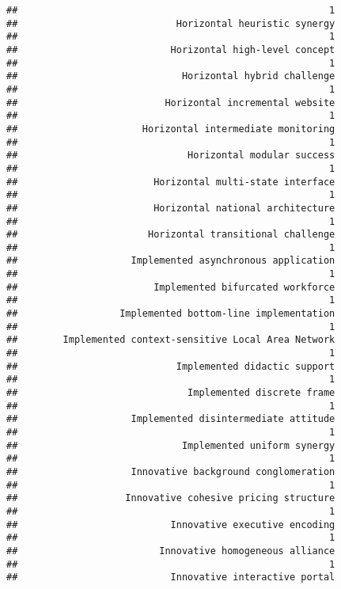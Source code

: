 \documentclass[
]{article}
\begin{document}
\begin{verbatim}
##                                                       1 
##                            Horizontal heuristic synergy 
##                                                       1 
##                           Horizontal high-level concept 
##                                                       1 
##                             Horizontal hybrid challenge 
##                                                       1 
##                          Horizontal incremental website 
##                                                       1 
##                      Horizontal intermediate monitoring 
##                                                       1 
##                              Horizontal modular success 
##                                                       1 
##                        Horizontal multi-state interface 
##                                                       1 
##                        Horizontal national architecture 
##                                                       1 
##                       Horizontal transitional challenge 
##                                                       1 
##                    Implemented asynchronous application 
##                                                       1 
##                        Implemented bifurcated workforce 
##                                                       1 
##                  Implemented bottom-line implementation 
##                                                       1 
##        Implemented context-sensitive Local Area Network 
##                                                       1 
##                            Implemented didactic support 
##                                                       1 
##                              Implemented discrete frame 
##                                                       1 
##                    Implemented disintermediate attitude 
##                                                       1 
##                             Implemented uniform synergy 
##                                                       1 
##                    Innovative background conglomeration 
##                                                       1 
##                   Innovative cohesive pricing structure 
##                                                       1 
##                           Innovative executive encoding 
##                                                       1 
##                         Innovative homogeneous alliance 
##                                                       1 
##                           Innovative interactive portal 

\end{verbatim}
\end{document}
